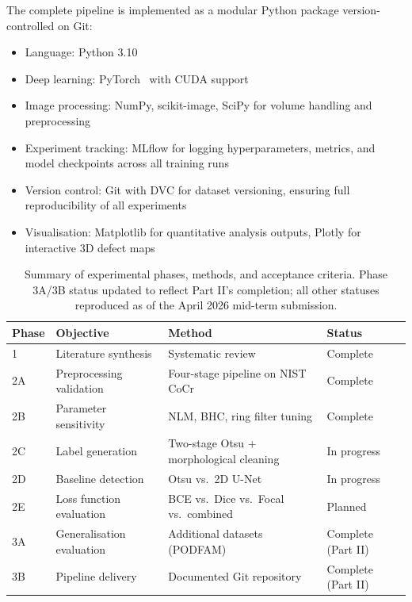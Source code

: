 The complete pipeline is implemented as a modular Python package version-controlled on Git:
\begin{itemize}
\item Language: Python 3.10
\item Deep learning: PyTorch~\citep{Paszke2019} with CUDA support
\item Image processing: NumPy, scikit-image, SciPy for volume handling and preprocessing
\item Experiment tracking: MLflow for logging hyperparameters, metrics, and model checkpoints
  across all training runs
\item Version control: Git with DVC for dataset versioning, ensuring full reproducibility of all
  experiments
\item Visualisation: Matplotlib for quantitative analysis outputs, Plotly for interactive 3D defect
  maps
\end{itemize}

\begin{table}[htbp]
\centering
\caption{Summary of experimental phases, methods, and acceptance criteria. Phase 3A/3B status
  updated to reflect Part II's completion; all other statuses reproduced as of the April 2026
  mid-term submission.}
\label{tab:experimental_design}
\small
\begin{tabular}{p{1.0cm}p{3.0cm}p{5.4cm}p{2.8cm}}
\toprule
\textbf{Phase} & \textbf{Objective} & \textbf{Method} & \textbf{Status} \\
\midrule
1  & Literature synthesis & Systematic review & Complete \\
2A & Preprocessing validation & Four-stage pipeline on NIST CoCr & Complete \\
2B & Parameter sensitivity & NLM, BHC, ring filter tuning & Complete \\
2C & Label generation & Two-stage Otsu + morphological cleaning & In progress \\
2D & Baseline detection & Otsu vs.\ 2D U-Net & In progress \\
2E & Loss function evaluation & BCE vs.\ Dice vs.\ Focal vs.\ combined & Planned \\
3A & Generalisation evaluation & Additional datasets (PODFAM) & Complete (Part II) \\
3B & Pipeline delivery & Documented Git repository & Complete (Part II) \\
\bottomrule
\end{tabular}
\end{table}
